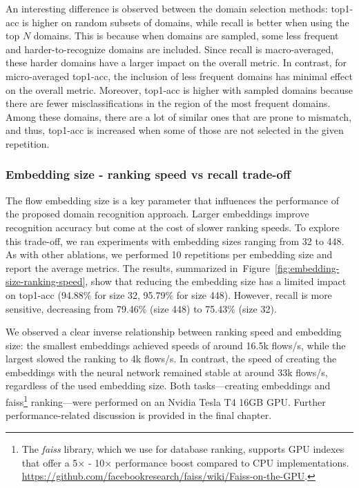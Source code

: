 \documentclass[lettersize,journal,twoside,article]{IEEEtran}
\newcommand{\figref}[1]{Figure~\ref{#1}}
\begin{document}
An interesting difference is observed between the domain selection methods: top1-acc is higher on random subsets of domains, while recall is better when using the top $N$ domains. This is because when domains are sampled, some less frequent and harder-to-recognize domains are included. Since recall is macro-averaged, these harder domains have a larger impact on the overall metric. In contrast, for micro-averaged top1-acc, the inclusion of less frequent domains has minimal effect on the overall metric. Moreover, top1-acc is higher with sampled domains because there are fewer misclassifications in the region of the most frequent domains. Among these domains, there are a lot of similar ones that are prone to mismatch, and thus, top1-acc is increased when some of those are not selected in the given repetition.

\subsubsection{Embedding size - ranking speed vs recall trade-off}
\label{sec:ablation-ranking-speed}
The flow embedding size is a key parameter that influences the performance of the proposed domain recognition approach. Larger embeddings improve recognition accuracy but come at the cost of slower ranking speeds. To explore this trade-off, we ran experiments with embedding sizes ranging from 32 to 448. As with other ablations, we performed 10 repetitions per embedding size and report the average metrics. The results, summarized in~\figref{fig:embedding-size-ranking-speed}, show that reducing the embedding size has a limited impact on top1-acc (94.88\% for size 32, 95.79\% for size 448). However, recall is more sensitive, decreasing from 79.46\% (size 448) to 75.43\% (size 32).

We observed a clear inverse relationship between ranking speed and embedding size: the smallest embeddings achieved speeds of around 16.5k flows/s, while the largest slowed the ranking to 4k flows/s. In contrast, the speed of creating the embeddings with the neural network remained stable at around 33k flows/s, regardless of the used embedding size. Both tasks---creating embeddings and faiss\footnote{The \textit{faiss} library, which we use for database ranking, supports GPU indexes that offer a 5$\times$ - 10$\times$ performance boost compared to CPU implementations. \url{https://github.com/facebookresearch/faiss/wiki/Faiss-on-the-GPU}.} ranking---were performed on an Nvidia Tesla T4 16GB GPU. Further performance-related discussion is provided in the final chapter.
\end{document}
